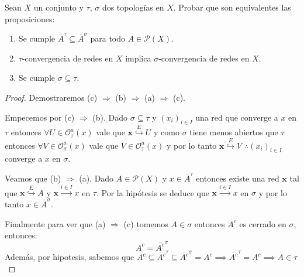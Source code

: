 \documentclass{article}
\theoremstyle{plain}
\theoremstyle{definition}
\newcommand{\cl}[1]{\overline{#1}}              %
\newcommand{\partes}{\mathcal{P}}               %
\newcommand{\evto}[1]{\stackrel{E}{\hookrightarrow} #1}   %
\newenvironment{ejercicio}[1]{\begin{trivlist}
\item[\hskip \labelsep {\bfseries Ejercicio}\hskip \labelsep {\bfseries #1.}]}{\end{trivlist}}
\begin{document}
\begin{ejercicio}{2}
    Sean \( X \) un conjunto y \( \tau \), \( \sigma \) dos topologías en \( X \). Probar que son equivalentes las proposiciones:
    \begin{enumerate}
        \item Se cumple \( \cl{A}^{\tau} \subseteq \cl{A}^{\sigma} \) para todo \( A \in \partes(X) \).
        \item \( \tau \)-convergencia de redes en \( X \) implica \( \sigma \)-convergencia de redes en \( X \).
        \item Se cumple \( \sigma \subseteq \tau \).
    \end{enumerate}
\end{ejercicio}
\begin{proof}
    Demostraremos (c) \( \Rightarrow \) (b) \( \Rightarrow \) (a) \( \Rightarrow \) (c).

    Empecemos por (c) \( \Rightarrow \) (b). Dado \( \sigma \subseteq \tau \) y \( {(x_i)}_{i \in I} \) una red que converge a \( x \) en \( \tau \) entonces \( \forall U \in \mathcal{O}^a_{\tau}(x) \) vale que
    \( \mathbf{x} \evto{U} \) y como \( \sigma \) tiene menos abiertos que \( \tau \) entonces \( \forall V \in \mathcal{O}^a_{\sigma}(x) \) vale que \( V \in \mathcal{O}^a_{\tau}(x) \) y por lo tanto \( \mathbf{x} \evto{V} \)
    \( \therefore {(x_i)}_{i \in I} \) converge a \( x \) en \( \sigma \).

    Veamos que (b) \( \Rightarrow \) (a). Dado \( A \in \partes(X) \) y \( x \in \cl{A}^{\tau} \) entonces existe una red \( \mathbf{x} \) tal que \( \mathbf{x} \evto{A} \) y \( \mathbf{x} \xrightarrow{i \in I} x \) en \( \tau \). Por la hipótesis se deduce que \( \mathbf{x} \xrightarrow{i \in I} x \) en \( \sigma \) y por lo tanto \( x \in \cl{A}^{\sigma} \).

    Finalmente para ver que (a) \( \Rightarrow \) (c) tomemos \( A \in \sigma \) entonces \( A^c \) es cerrado en \( \sigma \), entonces:  \[
        A^c = \cl{A^c}^{\sigma}
    \]
    Además, por hipotesis, sabemos que \( A^c \subseteq \cl{A^c}^{\tau} \subseteq \cl{A^c}^{\sigma} = A^c \implies \cl{A^c}^{\tau} = A^c \implies A \in \tau \)
\end{proof}
\end{document}
